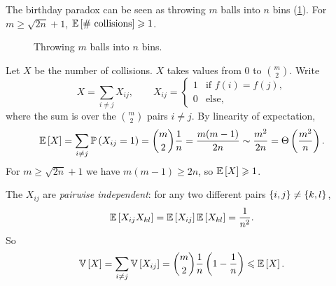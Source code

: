 The birthday paradox can be seen as throwing $m$ balls into $n$ bins (\cref{fig:balls-0903}). For
$m \geq \sqrt{2n} + 1$, $\expectation{\text{\# collisions}} \geq 1$.

\begin{figure}[ht]
    \centering
    \caption{Throwing $m$ balls into $n$ bins.}
    \label{fig:balls-0903}
\end{figure}

Let $X$ be the number of collisions. $X$ takes values from $0$ to $\binom{m}{2}$. Write
\[X = \sum_{i \neq j} X_{ij},
    \qquad
    X_{ij} = \begin{cases}
        1 & \text{if } f(i) = f(j), \\
        0 & \text{else,}
    \end{cases}\]
where the sum is over the $\binom{m}{2}$ pairs $i \neq j$. By linearity of expectation,
\[\expectation{X} = \sum_{i \neq j} \prob{X_{ij} = 1} = \binom{m}{2} \frac{1}{n}
    = \frac{m(m-1)}{2n} \sim \frac{m^2}{2n} = \bigTh{\frac{m^2}{n}}.\]
For $m \geq \sqrt{2n} + 1$ we have $m(m-1) \geq 2n$, so $\expectation{X} \geq 1$.

\begin{claim}\label{lem:pairwise-0903}
    The $X_{ij}$ are \emph{pairwise independent}: for any two different pairs
    $\left\lbrace i,j\right\rbrace \neq \left\lbrace k,l\right\rbrace$,
    \[\expectation{X_{ij} X_{kl}} = \expectation{X_{ij}} \expectation{X_{kl}} = \frac{1}{n^2}.\]
    So
    \[\variance{X} = \sum_{i \neq j} \variance{X_{ij}}
        = \binom{m}{2} \frac{1}{n} \left(1 - \frac{1}{n}\right) \leq \expectation{X}.\]
\end{claim}

